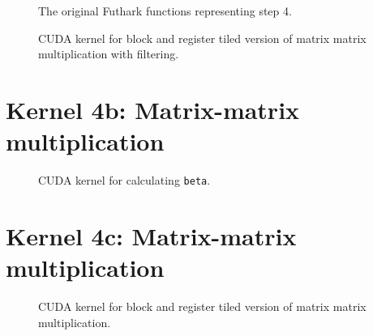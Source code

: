 \begin{figure}[H]
    \centering
    \caption{The original Futhark functions representing step 4.}
    \label{fut:kernel4}
\end{figure}

\begin{figure}[H]
    \centering
    \caption{CUDA kernel for block and register tiled version of matrix matrix
    multiplication with filtering.}
    \label{cuda:kernel4a}
\end{figure}


\section{Kernel 4b:  Matrix-matrix multiplication}

\begin{figure}[H]
    \centering
    \caption{CUDA kernel for calculating \texttt{beta}.}
    \label{cuda:kernel4b}
\end{figure}


\section{Kernel 4c:  Matrix-matrix multiplication}

\begin{figure}[H]
    \centering
    \caption{CUDA kernel for block and register tiled version of matrix matrix multiplication.}
    \label{cuda:kernel4c}
\end{figure}



